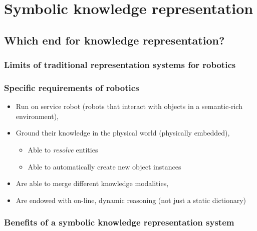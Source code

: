\chapter{Symbolic knowledge representation}

\section{Which end for knowledge representation?}
\label{sect|krs-purpose}

\subsection{Limits of traditional representation systems for robotics}
\label{subssect|limits}

\subsection{Specific requirements of robotics}
\label{subssect|robotics-specifics}

\begin{itemize}
	\item Run on service robot (robots that interact with objects in a semantic-rich environment),
	\item Ground their knowledge in the physical world (physically embedded),
	\begin{itemize}
		\item Able to \emph{resolve} entities
		\item Able to automatically create new object instances
	\end{itemize}
	\item Are able to merge different knowledge modalities,
	\item Are endowed with on-line, dynamic reasoning (not just a static dictionary)
\end{itemize}

\subsection{Benefits of a symbolic knowledge representation system}
\label{subssect|krs-benefits}


